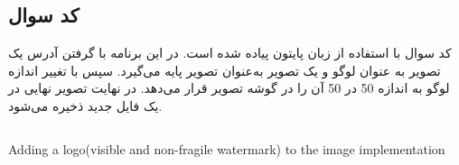 \subsection{کد سوال}
کد سوال با استفاده از زبان پایتون پیاده شده است. در این برنامه با گرفتن آدرس یک تصویر به عنوان لوگو و یک تصویر به‌عنوان تصویر پایه می‌گیرد. سپس با تغییر اندازه لوگو به اندازه 50 در 50 آن را در گوشه تصویر قرار می‌دهد. در نهایت تصویر نهایی در یک فایل جدید ذخیره می‌شود.
\begin{latin}
\begin{listing}[ht]
    \inputminted{python}{sources/Watermarking.py}
    \caption{Adding a logo(visible and non-fragile watermark) to the image implementation}
    \label{code:watermark}
\end{listing}
\end{latin}


